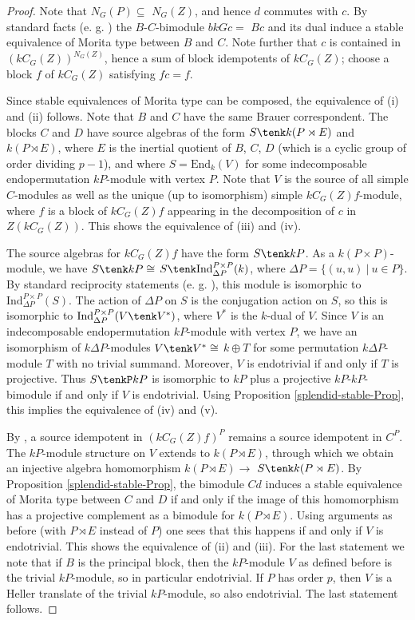 \documentclass{amsart}
\theoremstyle{plain}\newtheorem{Theorem}{Theorem}[section]
\theoremstyle{plain}\newtheorem{Conjecture}[Theorem]{Conjecture}
\theoremstyle{plain}\newtheorem{Corollary}[Theorem]{Corollary}
\theoremstyle{plain}\newtheorem{Lemma}[Theorem]{Lemma}
\theoremstyle{plain}\newtheorem{Proposition}[Theorem]{Proposition}
\theoremstyle{definition}\newtheorem{Definition}[Theorem]{Definition}
\theoremstyle{definition}\newtheorem{Example}[Theorem]{Example}
\theoremstyle{definition}\newtheorem{Examples}[Theorem]{Examples}
\theoremstyle{definition}\newtheorem{Exercise}[Theorem]{Exercise}
\theoremstyle{definition}\newtheorem{Notation}[Theorem]{Notation}
\theoremstyle{definition}\newtheorem{Remark}[Theorem]{Remark}
\theoremstyle{definition}\newtheorem{Remarks}[Theorem]{Remarks}
\theoremstyle{plain}\newtheorem{Statement}[Theorem]{}
\def\End{\mathrm{End}}
\def\Ind{\mathrm{Ind}}    \def\tenC{\otimes_C}
\begin{document}
 \begin{proof}
 Note that $N_G(P)\subseteq $ $N_G(Z)$, and hence
 $d$ commutes with $c$. 
 By standard facts (e. g. \cite[Theorem 9.8.6]{LiBookII}) 
 the $B$-$C$-bimodule $bkGc=$ $Bc$ and its dual induce a stable equivalence of
 Morita type between $B$ and $C$.  Note further that $c$ is contained in 
 $(kC_G(Z))^{N_G(Z)}$, hence  a sum of block idempotents of $kC_G(Z)$; choose
 a block $f$ of $kC_G(Z)$ satisfying $fc=f$.
 
 Since stable equivalences of Morita type
 can be composed,  the equivalence of (i) and (ii) follows. 
 Note that $B$ and $C$ have the same Brauer correspondent.
 The blocks $C$ and $D$ have source algebras of the form
 $S\tenk k(P\rtimes E)$ and $k(P\rtimes E)$, where $E$ is the inertial
 quotient of $B$, $C$, $D$ (which is a cyclic group of order dividing $p-1$),
 and where $S=\End_k(V)$ for some indecomposable endopermutation 
 $kP$-module with vertex $P$.
 Note that $V$ is the source of all simple $C$-modules as well as the
 unique (up to isomorphism) simple $kC_G(Z)f$-module, where $f$ is a block
 of $kC_G(Z)f$ appearing in the decomposition of $c$ in $Z(kC_G(Z))$.
 This shows the equivalence of (iii) and (iv). 
 
The source algebras for $kC_G(Z)f$ have the form $S\tenk kP$.
As a $k(P\times P)$-module, we have $S\tenk kP\cong$ 
$S\tenk \Ind^{P\times P}_{\Delta P}(k)$, where $\Delta P=\{(u,u)\ |\ u\in P\}$.
By standard reciprocity statements (e. g. \cite[Proposition 2.4.12]{LiBookI}),
this module is isomorphic to $\Ind^{P\times P}_{\Delta P}(S)$. The action
of $\Delta P$ on $S$ is the conjugation action on $S$, so this is isomorphic to
$\Ind^{P\times P}_{\Delta P}(V\tenk V^*)$, where $V^*$ is the $k$-dual of $V$. 
Since $V$ is an indecomposable
endopermutation $kP$-module with vertex $P$, we have an isomorphism
of $k\Delta P$-modules $V\tenk V^*\cong$ $k \oplus T$ for some
permutation $k\Delta P$-module $T$ with no trivial summand. Moreover,
$V$ is endotrivial if and only if $T$ is projective. Thus $S\tenkP kP$ is
isomorphic to $kP$ plus a projective $kP$-$kP$-bimodule if and only
if $V$ is endotrivial.
Using Proposition \ref{splendid-stable-Prop}, this  implies the equivalence of 
(iv) and (v).
 
By \cite[Theorem 11.2.2]{LiBookII}, a source idempotent in $(kC_G(Z)f)^P$ 
remains a source idempotent in  $C^P$.
The $kP$-module structure on $V$ extends to $k(P\rtimes E)$, through which
we obtain an injective algebra homomorphism $k(P\rtimes E)\to$
$S\tenk k(P\rtimes E)$. By Proposition \ref{splendid-stable-Prop}, the
bimodule $Cd$ induces a stable equivalence of Morita type between $C$ and $D$
if and only if the image of this homomorphism  has a projective complement as
a bimodule for $k(P\rtimes E)$. Using arguments as before (with $P\rtimes E$ 
instead of $P$) one sees that this happens if and only if $V$ is endotrivial.
This shows the equivalence of (ii) and (iii).
For the last statement we note that if $B$ is the principal block, then
the $kP$-module $V$ as defined before is the trivial $kP$-module, so 
in particular endotrivial. If $P$ has order $p$, then $V$ is a Heller translate of
the trivial $kP$-module, so also endotrivial. The last statement follows.
\end{proof}
 
\end{document}
